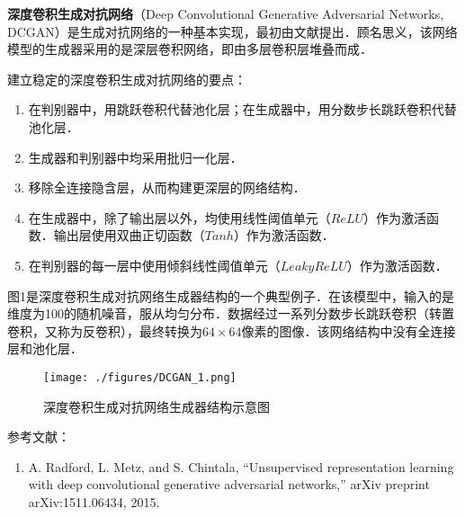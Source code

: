 
\textbf{深度卷积生成对抗网络}（Deep Convolutional Generative Adversarial Networks, DCGAN）是生成对抗网络的一种基本实现，最初由文献\cite{DCGAN}提出．顾名思义，该网络模型的生成器采用的是深层卷积网络，即由多层卷积层堆叠而成．

建立稳定的深度卷积生成对抗网络的要点\cite{DCGAN}：
\begin{enumerate}
\item 在判别器中，用跳跃卷积代替池化层；在生成器中，用分数步长跳跃卷积代替池化层．
\item 生成器和判别器中均采用批归一化层．
\item 移除全连接隐含层，从而构建更深层的网络结构．
\item 在生成器中，除了输出层以外，均使用线性阈值单元（$ReLU$）作为激活函数．输出层使用双曲正切函数（$Tanh$）作为激活函数．
\item 在判别器的每一层中使用倾斜线性阈值单元（$Leaky ReLU$）作为激活函数．
\end{enumerate}


图1是深度卷积生成对抗网络生成器结构的一个典型例子．在该模型中，输入的是维度为100的随机噪音，服从均匀分布．数据经过一系列分数步长跳跃卷积（转置卷积，又称为反卷积），最终转换为$64 \times64$像素的图像．该网络结构中没有全连接层和池化层．
\begin{figure}[ht]
\centering
\texttt{[image: ./figures/DCGAN\_1.png]}
\caption{深度卷积生成对抗网络生成器结构示意图 \cite{DCGAN}} \label{DCGAN_fig1}
\end{figure}







参考文献：
\begin{enumerate}
\item A. Radford, L. Metz, and S. Chintala, “Unsupervised representation learning with deep convolutional generative adversarial networks,” arXiv preprint arXiv:1511.06434, 2015.
\end{enumerate}